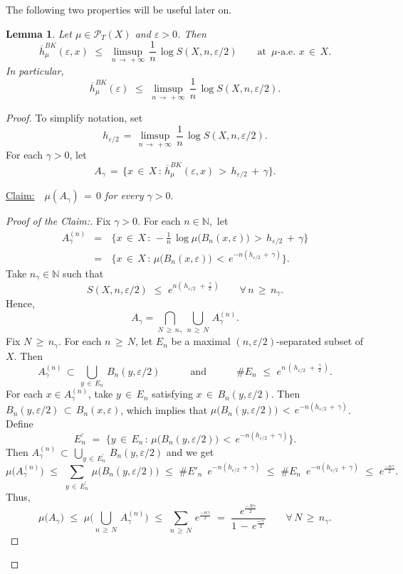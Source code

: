 \documentclass[11pt,a4paper,reqno]{amsart}
\newenvironment{claim}[1]{\par\noindent\underline{Claim:}\space#1}{}
\theoremstyle{plain}
\newtheorem{lemma}[theorem]{Lemma}
\theoremstyle{definition}
\newcommand{\field}[1]{\mathbb{#1}}
\newcommand{\NN}{\field{N}}
\newcommand{\ga} {\gamma}    \newcommand{\Ga}{\Gamma}
\newcommand{\ep} {\varepsilon}
\newcommand{\vep}{\varepsilon}
\newcommand{\cP}{{\mathcal P}}
\begin{document}
\smallskip

The following two properties will be useful later on.

\smallskip

\begin{lemma}\label{BK_leq_ep-entropy}
Let $\mu\in\cP_T(X)$ and $\ep>0$. Then $$\overline{h}^{BK}_\mu(\ep,x)\,\,\leq\,\, \limsup_{n\, \to \, +\infty}\, \frac{1}{n}\,\log S(X,n,\vep/2)\qquad\text{at }\,\mu\text{-a.e. }x\,\in\,X.$$
In particular, $$\overline{h}^{BK}_\mu(\ep)\,\,\leq\,\, \limsup_{n\, \to \, +\infty}\, \frac{1}{n}\,\log S(X,n,\vep/2).$$
\end{lemma}

\begin{proof}
To simplify notation, set 
$$h_{\ep/2} \,=\,\limsup_{n\, \to \, +\infty}\, \frac{1}{n}\,\log S(X,n,\vep/2).$$
For each $\ga>0$, let $$A_\ga\,=\,\{x\,\in\,X\,\colon\, \overline{h}^{BK}_\mu(\ep,x) \,>\,h_{\ep/2}\,+\,\ga\}.$$
\medskip

\begin{claim} \emph{$\quad\mu(A_\ga)\,=\,0$ for every $\ga>0.$}
\end{claim}

\begin{proof}[Proof of the Claim:]
Fix $\ga>0$. For each $n\in\NN,$ let 
\begin{eqnarray*}
A_\ga^{(n)}&=&\,\big\{x\,\in\,X\,\colon\, -\frac{1}{n}\,\log\mu\big(B_n(x,\ep)\big) \,>\,h_{\ep/2}\,+\,\ga\big\} \\ &=&\,\big\{x\,\in\,X\,\colon\, \mu\big(B_n(x,\ep)\big) \,<\,e^{-n(h_{\ep/2}\,+\,\ga)}\big\}.
\end{eqnarray*}
Take $n_\ga\in\NN$ such that $$S(X,n,\vep/2)\,\,\leq\,\,e^{n(\,h_{\ep/2}\,\,+\,\frac{\ga}{2}\,)}\qquad\forall\, n\,\geq\, n_\ga.$$
Hence, 
$$A_\ga=\bigcap_{N\,\geq\,n_\ga} \,\bigcup_{n\,\geq\,N} \,A_\ga^{(n)}.$$ 
Fix $N\,\geq\,n_\ga$. For each $n\,\geq\,N$, let $E_n$ be a maximal $(n,\ep/2)$-separated subset of $X.$ Then $$A_\ga^{(n)}\,\subset\,\bigcup_{y\,\in\,E_n}\,B_n(y,\ep/2)\qquad\quad\text{and}\quad\qquad \#E_n\,\,\leq\,\,e^{n\,(\,h_{\ep/2}\,\,+\,\frac{\ga}{2}\,)}.$$ For each $x\in A_\ga^{(n)}$, take $
y\,\in\,E_n$ satisfying $x\,\in\,B_n(y,\ep/2)$. Then $B_n(y,\ep/2)\,\subset\,B_n(x,\ep)$, which implies that $\mu\big(B_n(y,\ep/2)\big)\,<\,e^{-n(h_{\ep/2}\,+\,\ga)}$. Define $$E^\prime_n\,\,=\,\,\Big\{y\,\in\,E_n\,\colon\,\mu\big(B_n(y,\ep/2)\big)\,<\,e^{-n(h_{\ep/2}\,+\,\ga)} \Big\}.$$ 
Then $A_\ga^{(n)}\,\subset\,\bigcup_{y\,\in\,E^\prime_n}\,B_n(y,\ep/2)$ and we get 
$$\mu\big( A_\ga^{(n)}\big)\,\,\leq\,\,\sum_{y\,\in\,E^\prime_n}\,\mu\big(B_n(y,\ep/2)\big)\,\,\leq\,\,\#E'_n\,\,\,e^{-n(h_{\ep/2}\,+\,\ga)}\,\,\leq\,\,\#E_n\,\,\,e^{-n(h_{\ep/2}\,+\,\ga)}\,\,\leq\,\,e^{\frac{-n\ga}{2}}.$$ 
Thus, 
$$\mu\big( A_\ga \big)\,\,\leq\,\,\mu\Big( \bigcup_{n\,\geq\,N} \,A_\ga^{(n)} \Big)\,\,\leq\,\,\sum_{n\,\geq\,N} \,e^{\frac{-n\ga}{2}}\,\,=\,\, \frac{e^{\frac{-N\ga}{2}}}{1\,-\,e^{\frac{-\ga}{2}}}\qquad\forall \,N\,\geq\,n_\ga.$$


\end{proof}
\end{proof}
\end{document}
